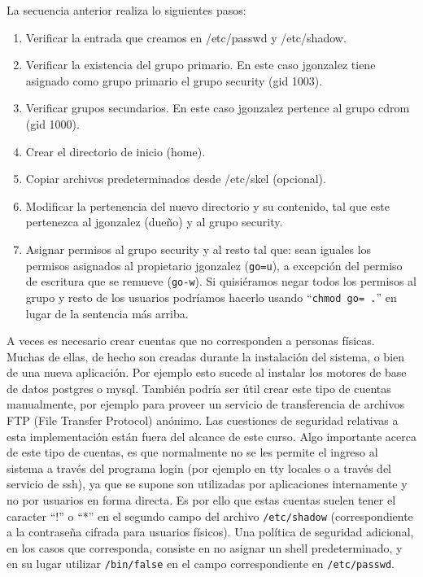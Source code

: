 \documentclass[12pt]{article}
\begin{document}
La secuencia anterior realiza lo siguientes pasos:
\begin{enumerate}
	\item Verificar la entrada que creamos en /etc/passwd y /etc/shadow. 
	\item Verificar la existencia del grupo primario.  En este caso jgonzalez tiene 
	      asignado como grupo primario el grupo security (gid 1003). 
	\item Verificar grupos secundarios. En este caso jgonzalez pertence al grupo cdrom (gid 1000).  
	\item Crear el directorio de inicio (home). 
	\item Copiar archivos predeterminados desde /etc/skel (opcional). 
	\item Modificar la pertenencia del nuevo directorio y su contenido, tal que este pertenezca al 
	jgonzalez (dueño) y al grupo security. 
	\item Asignar permisos al grupo security y al resto tal que: sean 
	iguales los permisos asignados al propietario jgonzalez (\texttt{go=u}),
        a excepción del permiso 
	de escritura que se remueve (\texttt{go-w}). Si quisiéramos negar
	todos los permisos al grupo y resto de los usuarios 
	podríamos hacerlo usando ``\texttt{chmod go= .}'' en lugar de la 
	sentencia más arriba. 
\end{enumerate}


	
A veces es necesario crear cuentas que no corresponden 
a personas físicas. Muchas de ellas, de hecho son creadas durante la 
instalación del sistema, o bien de una nueva aplicación. Por ejemplo esto 
sucede al instalar los motores de base de datos postgres o mysql. También 
podría ser útil crear este tipo de cuentas manualmente, por ejemplo para 
proveer un servicio de transferencia de archivos FTP (File Transfer Protocol) 
anónimo. Las cuestiones de seguridad relativas a esta implementación están fuera
del alcance de este curso. Algo importante acerca de este tipo de cuentas, es
que normalmente no se les permite el ingreso al sistema a través del programa 
login (por ejemplo en tty locales o a través del servicio de ssh), ya que se 
supone son utilizadas por aplicaciones internamente y no por usuarios en forma 
directa. Es por ello que estas cuentas suelen tener el caracter ``!'' o ``*'' en 
el segundo campo del archivo  \texttt{/etc/shadow} (correspondiente a la contraseña 
cifrada para usuarios físicos). Una política de seguridad adicional, en los 
casos que corresponda, consiste en no asignar un shell predeterminado, y en su lugar
utilizar \texttt{/bin/false} en el campo correspondiente en \texttt{/etc/passwd}.  
\end{document}
